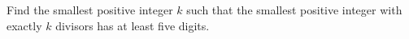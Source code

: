 Find the smallest positive integer $k$ such that the smallest positive integer with exactly $k$ divisors has at least five digits.
